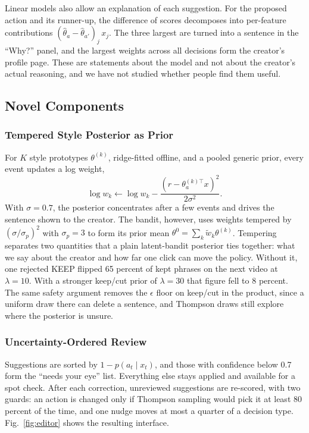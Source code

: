 \documentclass{ieeeaccess}
\begin{document}
Linear models also allow an explanation of each suggestion. For the proposed action and its runner-up, the difference of scores decomposes into per-feature contributions $(\hat\theta_{a}-\hat\theta_{a'})_j\,x_j$. The three largest are turned into a sentence in the ``Why?'' panel, and the largest weights across all decisions form the creator's profile page. These are statements about the model and not about the creator's actual reasoning, and we have not studied whether people find them useful.

\subsection{Novel Components}

\subsubsection{Tempered Style Posterior as Prior}
For $K$ style prototypes $\theta^{(k)}$, ridge-fitted offline, and a pooled generic prior, every event updates a log weight,
\begin{equation}
\log w_k \leftarrow \log w_k - \frac{\left(r - \theta^{(k)\top}_{a} x\right)^{2}}{2\sigma^{2}}. \label{eq:style}
\end{equation}
With $\sigma=0.7$, the posterior concentrates after a few events and drives the sentence shown to the creator. The bandit, however, uses weights tempered by $(\sigma/\sigma_p)^{2}$ with $\sigma_p=3$ to form its prior mean $\theta^{0}=\sum_k \tilde w_k \theta^{(k)}$. Tempering separates two quantities that a plain latent-bandit posterior ties together: what we say about the creator and how far one click can move the policy. Without it, one rejected KEEP flipped 65 percent of kept phrases on the next video at $\lambda=10$. With a stronger keep/cut prior of $\lambda=30$ that figure fell to 8 percent. The same safety argument removes the $\epsilon$ floor on keep/cut in the product, since a uniform draw there can delete a sentence, and Thompson draws still explore where the posterior is unsure.

\subsubsection{Uncertainty-Ordered Review}
Suggestions are sorted by $1-p(a_t\mid x_t)$, and those with confidence below 0.7 form the ``needs your eye'' list. Everything else stays applied and available for a spot check. After each correction, unreviewed suggestions are re-scored, with two guards: an action is changed only if Thompson sampling would pick it at least 80 percent of the time, and one nudge moves at most a quarter of a decision type. Fig.~\ref{fig:editor} shows the resulting interface.
\end{document}
